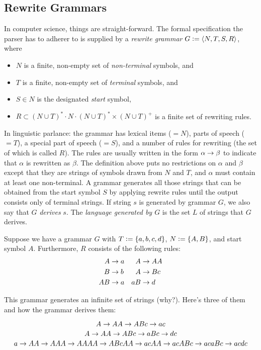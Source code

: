 \subsection{Rewrite Grammars}
\label{sub:BigPicture_Grammars}
In computer science, things are straight-forward.
The formal specification the parser has to adherer to is supplied by a \emph{rewrite grammar} $G \mathrel{\mathop:}= \left \langle N, T, S, R \right \rangle $, where
%
\begin{itemize}
    \item $N$ is a finite, non-empty set of \emph{non-terminal} symbols, and
    \item $T$ is a finite, non-empty set of \emph{terminal} symbols, and
    \item $S \in N$ is the designated \emph{start} symbol,
    \item $R \subset (N \cup T)^* \cdot N \cdot (N \cup T)^* \times (N \cup T)^+$ is a finite set of rewriting rules.
\end{itemize}
%
In linguistic parlance: the grammar has lexical items ($= N$), parts of speech ($=T$), a special part of speech ($=S$), and a number of rules for rewriting (the set of which is called $R$).
The rules are usually written in the form $\alpha \rightarrow \beta$ to indicate that $\alpha$ is rewritten as $\beta$.
The definition above puts no restrictions on $\alpha$ and $\beta$ except that they are strings of symbols drawn from $N$ and $T$, and $\alpha$ must contain at least one non-terminal.
A grammar generates all those strings that can be obtained from the start symbol $S$ by applying rewrite rules until the output consists only of terminal strings.
If string $s$ is generated by grammar $G$, we also say that $G$ \emph{derives} $s$.
The \emph{language generated by $G$} is the set $L$ of strings that $G$ derives.
%
\begin{examplebox}
    Suppose we have a grammar $G$ with $T \mathrel{\mathop:}= \left \{ a,b,c,d \right \}$, $N \mathrel{\mathop:}= \left \{ A,B \right \}$, and start symbol $A$.
    Furthermore, $R$ consists of the following rules:
    \begin{align*}
        A &\rightarrow a & A &\rightarrow AA\\
        B &\rightarrow b & A & \rightarrow Bc\\
        AB &\rightarrow a & aB & \rightarrow d\\
    \end{align*}

    This grammar generates an infinite set of strings (why?).
    Here's three of them and how the grammar derives them:

    \[
        A
        \rightarrow AA 
        \rightarrow ABc
        \rightarrow ac
    \]
    \[
        A
        \rightarrow AA
        \rightarrow ABc
        \rightarrow aBc
        \rightarrow dc
    \]
    \[
        a
        \rightarrow AA
        \rightarrow AAA
        \rightarrow AAAA
        \rightarrow ABcAA
        \rightarrow acAA
        \rightarrow acABc
        \rightarrow acaBc
        \rightarrow acdc
    \]
\end{examplebox}

